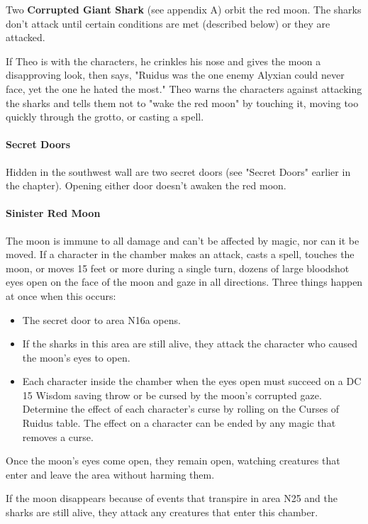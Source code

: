 \documentclass[10pt,a4paper,twoside,twocolumn,openany,nodeprecatedcode]{dndbook}
\begin{document}
Two \textbf{Corrupted Giant Shark} (see appendix A) orbit the red moon. The sharks don't attack until certain conditions are met (described below) or they are attacked.

If Theo is with the characters, he crinkles his nose and gives the moon a disapproving look, then says, "Ruidus was the one enemy Alyxian could never face, yet the one he hated the most." Theo warns the characters against attacking the sharks and tells them not to "wake the red moon" by touching it, moving too quickly through the grotto, or casting a spell.

\paragraph{Secret Doors}
Hidden in the southwest wall are two secret doors (see "Secret Doors" earlier in the chapter). Opening either door doesn't awaken the red moon.

\paragraph{Sinister Red Moon}
The moon is immune to all damage and can't be affected by magic, nor can it be moved. If a character in the chamber makes an attack, casts a spell, touches the moon, or moves 15 feet or more during a single turn, dozens of large bloodshot eyes open on the face of the moon and gaze in all directions. Three things happen at once when this occurs:


\begin{itemize}
\item The secret door to area N16a opens.
\item If the sharks in this area are still alive, they attack the character who caused the moon's eyes to open.
\item Each character inside the chamber when the eyes open must succeed on a DC 15 Wisdom saving throw or be cursed by the moon's corrupted gaze. Determine the effect of each character's curse by rolling on the Curses of Ruidus table. The effect on a character can be ended by any magic that removes a curse.
\end{itemize}

Once the moon's eyes come open, they remain open, watching creatures that enter and leave the area without harming them.

If the moon disappears because of events that transpire in area N25 and the sharks are still alive, they attack any creatures that enter this chamber.
\end{document}
